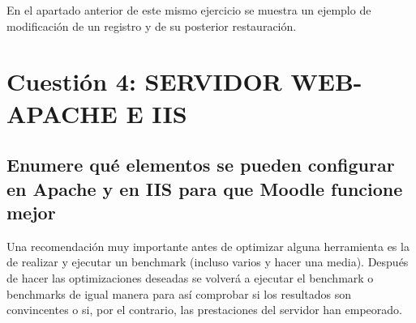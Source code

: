 En el apartado anterior de este mismo ejercicio se muestra un ejemplo de modificación de un registro y de su posterior restauración.

\newpage

\section{Cuestión 4: SERVIDOR WEB-APACHE E IIS}

\subsection{Enumere qué elementos se pueden configurar en Apache y en
	IIS para que Moodle funcione mejor}

Una recomendación muy importante antes de optimizar alguna herramienta es la de realizar y ejecutar un benchmark (incluso
varios y hacer una media). Después de hacer las optimizaciones deseadas se volverá a ejecutar el benchmark o benchmarks de igual manera para así comprobar si los resultados son convincentes o si, por el contrario, las prestaciones del servidor han empeorado.

